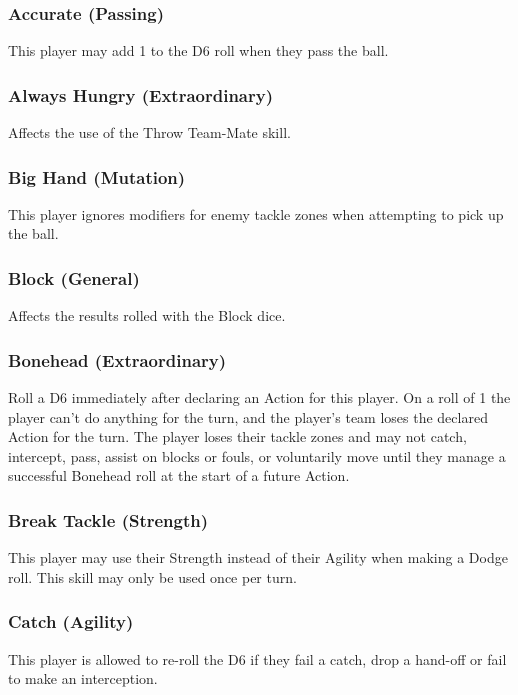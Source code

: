 \begin{multicols}{3}

\subsubsection{Accurate (Passing)}
\par This player may add 1 to the D6 roll when they pass the ball.

\subsubsection{Always Hungry (Extraordinary)}
\par Affects the use of the Throw Team-Mate skill.

\subsubsection{Big Hand (Mutation)}
\par This player ignores modifiers for enemy tackle zones when attempting to pick up the ball.

\subsubsection{Block (General)}
\par Affects the results rolled with the Block dice.

\subsubsection{Bonehead (Extraordinary)}
\par Roll a D6 immediately after declaring an Action for this player. On a roll of 1 the player can't do anything for the turn, and the player's team loses the declared Action for the turn. The player loses their tackle zones and may not catch, intercept, pass, assist on blocks or fouls, or voluntarily move until they manage a successful Bonehead roll at the start of a future Action.

\subsubsection{Break Tackle (Strength)}
\par This player may use their Strength instead of their Agility when making a Dodge roll. This skill may only be used once per turn.

\subsubsection{Catch (Agility)}
\par This player is allowed to re-roll the D6 if they fail a catch, drop a hand-off or fail to make an interception.


\end{multicols}

